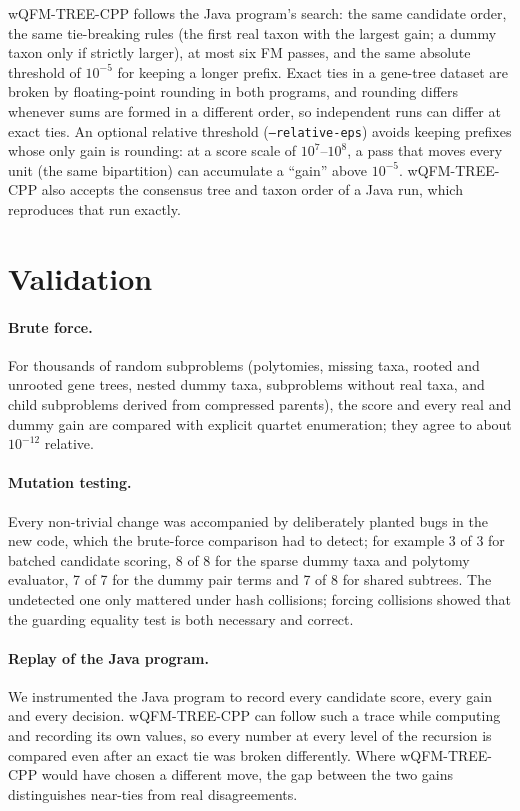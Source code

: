 \documentclass[11pt,a4paper]{article}
\newcommand{\cpp}{wQFM-TREE-CPP}
\begin{document}
\cpp{} follows the Java program's search: the same candidate order, the same tie-breaking rules (the
first real taxon with the largest gain; a dummy taxon only if strictly larger), at most six FM
passes, and the same absolute threshold of $10^{-5}$ for keeping a longer prefix. Exact ties in a
gene-tree dataset are broken by floating-point rounding in both programs, and rounding differs
whenever sums are formed in a different order, so independent runs can differ at exact ties. An
optional relative threshold (\texttt{--relative-eps}) avoids keeping prefixes whose only gain is
rounding: at a score scale of $10^7$--$10^8$, a pass that moves every unit (the same bipartition)
can accumulate a ``gain'' above $10^{-5}$. \cpp{} also accepts the consensus tree and taxon order of
a Java run, which reproduces that run exactly.

\section{Validation}\label{sec:validation}

\paragraph{Brute force.} For thousands of random subproblems (polytomies, missing taxa, rooted and
unrooted gene trees, nested dummy taxa, subproblems without real taxa, and child subproblems derived
from compressed parents), the score and every real and dummy gain are compared with explicit quartet
enumeration; they agree to about $10^{-12}$ relative.

\paragraph{Mutation testing.} Every non-trivial change was accompanied by deliberately planted bugs in
the new code, which the brute-force comparison had to detect; for example 3 of 3 for batched
candidate scoring, 8 of 8 for the sparse dummy taxa and polytomy evaluator, 7 of 7 for the dummy pair
terms and 7 of 8 for shared subtrees. The undetected one only mattered under hash collisions; forcing
collisions showed that the guarding equality test is both necessary and correct.

\paragraph{Replay of the Java program.} We instrumented the Java program to record every candidate
score, every gain and every decision. \cpp{} can follow such a trace while computing and recording its
own values, so every number at every level of the recursion is compared even after an exact tie was
broken differently. Where \cpp{} would have chosen a different move, the gap between the two gains
distinguishes near-ties from real disagreements.
\end{document}
